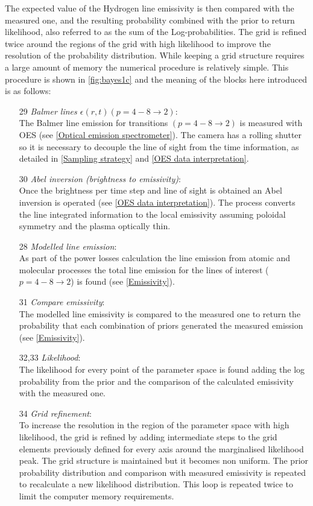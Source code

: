 The expected value of the Hydrogen line emissivity is then compared with the measured one, and the resulting probability combined with the prior to return likelihood, also referred to as the sum of the Log-probabilities. The grid is refined twice around the regions of the grid with high likelihood to improve the resolution of the probability distribution. While keeping a grid structure requires a large amount of memory the numerical procedure is relatively simple.
This procedure is shown in \autoref{fig:bayes1c} and the meaning of the blocks here introduced is as follows:


\begin{enumerate}
    \item[29] \emph{Balmer lines $\epsilon(r,t)(p=4-8\rightarrow 2)$}: \\The Balmer line emission for transitions $(p=4-8\rightarrow 2)$ is measured with OES (see \autoref{Optical emission spectrometer}). The camera has a rolling shutter so it is necessary to decouple the line of sight from the time information, as detailed in \autoref{Sampling strategy} and \ref{OES data interpretation}.
    \item[30] \emph{Abel inversion (brightness to emissivity)}: \\Once the brightness per time step and line of sight is obtained an Abel inversion is operated (see \autoref{OES data interpretation}). The process converts the line integrated information to the local emissivity assuming poloidal symmetry and the plasma optically thin.
    \item[28] \emph{Modelled line emission}: \\As part of the power losses calculation the line emission from atomic and molecular processes the total line emission for the lines of interest ($p=4-8 \rightarrow 2$) is found (see \autoref{Emissivity}).
    \item[31] \emph{Compare emissivity}: \\The modelled line emissivity is compared to the measured one to return the probability that each combination of priors generated the measured emission (see \autoref{Emissivity}).
    \item[32,33] \emph{Likelihood}: \\The likelihood for every point of the parameter space is found adding the log probability from the prior and the comparison of the calculated emissivity with the measured one.
    \item[34] \emph{Grid refinement}: \\To increase the resolution in the region of the parameter space with high likelihood, the grid is refined by adding intermediate steps to the grid elements previously defined for every axis around the marginalised likelihood peak. The grid structure is maintained but it becomes non uniform. The prior probability distribution and comparison with measured emissivity is repeated to recalculate a new likelihood distribution. This loop is repeated twice to limit the computer memory requirements.

\end{enumerate}
